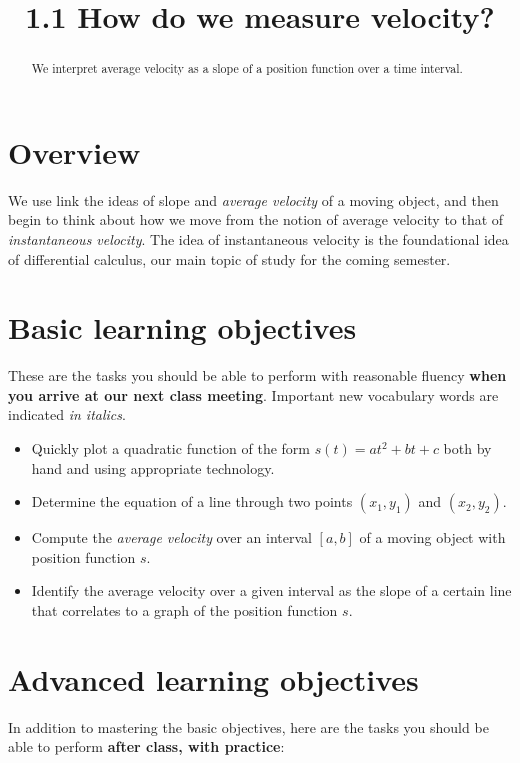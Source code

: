 \documentclass{ximera}
\title{1.1 How do we measure velocity?}
\begin{document}
\begin{abstract}
We interpret average velocity as a slope of a position function over a time interval.
\end{abstract}
\maketitle

\section{Overview}

We use link the ideas of slope and \emph{average velocity} of a moving object, and then begin to think about how we move from the notion of average velocity to that of \emph{instantaneous velocity}.  The idea of instantaneous velocity is the foundational idea of differential calculus, our main topic of study for the coming semester.


\section{Basic learning objectives}

These are the tasks you should be able to perform with reasonable fluency \textbf{when you arrive at our next class meeting}. Important new vocabulary words are indicated \emph{in italics}. 

\begin{itemize}
	\item Quickly plot a quadratic function of the form $s(t) = at^2 + bt + c$ both by hand and using appropriate technology.
	\item Determine the equation of a line through two points $(x_1, y_1)$ and $(x_2, y_2)$.
	\item Compute the \emph{average velocity} over an interval $[a,b]$ of a moving object with position function $s$.
	\item Identify the average velocity over a given interval as the slope of a certain line that correlates to a graph of the position function $s$.
\end{itemize}

\section{Advanced learning objectives}

In addition to mastering the basic objectives, here are the tasks you should be able to perform \textbf{after class, with practice}: 
\end{document}
